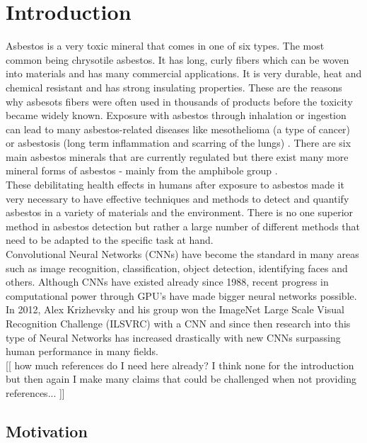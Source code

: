 \chapter{Introduction}

Asbestos is a very toxic mineral that comes in one of six types. The most common being chrysotile asbestos. It has long, curly fibers which can be woven into materials and has many commercial applications. It is very durable, heat and chemical resistant and has strong insulating properties. These are the reasons why asbesots fibers were often used in thousands of products before the toxicity became widely known. Exposure with asbestos through inhalation or ingestion can lead to many asbestos-related diseases like mesothelioma (a type of cancer) or asbestosis (long term inflammation and scarring of the lungs) \cite{asbestosMaacenter, MesotheliomaWiki, asbestosisWiki}. There are six main asbestos minerals that are currently regulated but there exist many more mineral forms of asbestos - mainly from the amphibole group \cite{environmental2008framework}.\\

These debilitating health effects in humans after exposure to asbestos made it very necessary to have effective techniques and methods to detect and quantify asbestos in a variety of materials and the environment. There is no one superior method in asbestos detection but rather a large number of different methods that need to be adapted to the specific task at hand. \\

Convolutional Neural Networks (CNNs) have become the standard in many areas such as image recognition, classification, object detection, identifying faces and others. Although CNNs have existed already since 1988, recent progress in computational power through GPU's have made bigger neural networks possible. In 2012, Alex Krizhevsky and his group won the ImageNet Large Scale Visual Recognition Challenge (ILSVRC) with a CNN and since then research into this type of Neural Networks has increased drastically with new CNNs surpassing human performance in many fields. \\

[[ how much references do I need here already?  I think none for the introduction but then again I make many claims that could be challenged when not providing references... ]]

\section{Motivation}

